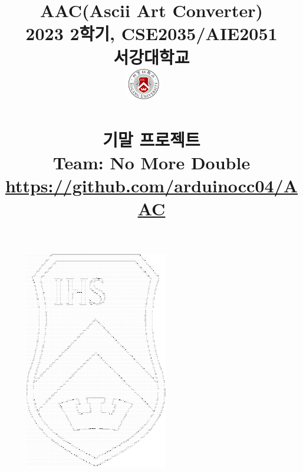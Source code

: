 \documentclass[conference]{IEEEtran}
\begin{document}
\newcommand{\libpng}{\textbf{libpng}}
\newcommand{\Eigen}{\textbf{Eigen}}

\newcommand{\eg}{\textbf{eg}}
\newcommand{\egExceptions}{\textbf{egExceptions}}
\newcommand{\egGeometry}{\textbf{egGeometry}}
\newcommand{\egLoader}{\textbf{egLoader}}
\newcommand{\egMath}{\textbf{egMath}}
\newcommand{\egMethods}{\textbf{egMethods}}
\newcommand{\egOperators}{\textbf{egOperators}}
\newcommand{\egProcessing}{\textbf{egProcessing}}
\newcommand{\egTrace}{\textbf{egTrace}}
\newcommand{\egTypes}{\textbf{egTypes}}

\newcommand{\imgascii}{\textbf{img2ascii}}
\newcommand{\tone}{\textbf{tone}}
\newcommand{\structure}{\textbf{structure}}

\title{AAC(Ascii Art Converter)\\ \vspace{1em}
{\large 2023 2학기, CSE2035/AIE2051 \\ 서강대학교 \\} \vspace{0.5em}
{\includegraphics[width=1.5cm]{./sogang_university_logo.png}}
{\large ~\\~}
{\large \\ 기말 프로젝트 \\ Team: No More Double \\ \vspace{-1em}\href{https://github.com/arduinocc04/AAC}{https://github.com/arduinocc04/AAC}}}
\author{
\and
{}
}

\begin{figure}
    \hspace{2.25em}
    \includegraphics[width=0.75\paperwidth]{ascii_logo_1.pdf}
    \end{figure}
\end{document}
